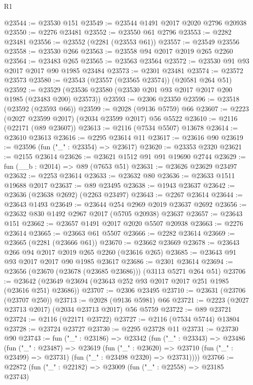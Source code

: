 \begin{lexlean}{R1}
\begin{coremodule}
@23544 := @23530 @151
@23549 := @23544 @1491 @2017 @2020 @2796 @20938
@23550 := @2276 @23481
@23552 := @23550 @61 @2796
@23553 := @2282 @23481
@23556 := @23552 (@2281 (@23553 @61))
@23557 := @23549 @23556
@23558 := @23530 @266
@23563 := @23558 @94 @2017 @2019 @265 @2260
@23564 := @23483 @265
@23565 := @23563 @23564
@23572 := @23530 @91 @93 @2017 @2017 @90 @1985 @23484
@23573 := @2301 @23481
@23574 := @23572 @23573
@23580 := @23543 (@23557 (@23565 @23574)) (@20581 @264 @51)
@23592 := @23529 (@23536 @23580 (@23530 @201 @93 @2017 @2017 @200 @1985 (@23483 @200) @23573))
@23593 := @2306 @23350
@23596 := @23518 (@23592 (@23593 @66))
@23599 := @2028 (@9136 @5759) @66
@23607 := @2223 (@2027 @23599 @2017) (@2034 @23599 @2017) @56 @5522
@23610 := @2116 (@22171 (@89 @23607))
@23613 := @2116 (@7534 @5507) @13678
@23614 := @23610 @23613
@23616 := @2295 @23614 @11
@23617 := @23616 @90
@23619 := @23596 (fun ("_" : @23354) => @23617)
@23620 := @23353 @2320
@23621 := @2155 @23614
@23626 := @23621 @1512 @91 @91 @19690 @2744
@23629 := fun (__b : @2014) => @89 (@7653 @51)
@23631 := @23626 @23629 @23497
@23632 := @2253 @23614
@23633 := @23632 @80
@23636 := @23633 @1511 @19688 @2017
@23637 := @89 @23495
@23638 := @1943 @23637
@23642 := @23636 (@23638 @2692) (@2263 @23497)
@23643 := @2267 @23614
@23644 := @23643 @1493
@23649 := @23644 @254 @2969 @2019 @23637 @2692
@23656 := @23632 @830 @1492 @2967 @2017 (@5705 @20938) @23637
@23657 := @23643 @151
@23662 := @23657 @1491 @2017 @2020 @5507 @20938
@23663 := @2276 @23614
@23665 := @23663 @61 @5507
@23666 := @2282 @23614
@23669 := @23665 (@2281 (@23666 @61))
@23670 := @23662 @23669
@23678 := @23643 @266 @94 @2017 @2019 @265 @2260 (@23616 @265)
@23685 := @23643 @91 @93 @2017 @2017 @90 @1985 @23617
@23686 := @2301 @23614
@23694 := @23656 (@23670 (@23678 (@23685 @23686))) (@3113 @5271 @264 @51)
@23706 := @23642 (@23649 @23694 (@23643 @252 @93 @2017 @2017 @251 @1985 (@23616 @251) @23686))
@23707 := @2306 @23495
@23710 := @23631 (@23706 (@23707 @250))
@23713 := @2028 (@9136 @5981) @66
@23721 := @2223 (@2027 @23713 @2017) (@2034 @23713 @2017) @56 @5759
@23722 := @89 @23721
@23724 := @2116 (@22171 @23722)
@23727 := @2116 (@7534 @5744) @13804
@23728 := @23724 @23727
@23730 := @2295 @23728 @11
@23731 := @23730 @90
@23743 := fun ("_" : @23186) =>
  @23342
    (fun ("_" : @23343) =>
    @23486
      (fun ("_" : @23487) =>
      @23619
        (fun ("_" : @23620) =>
        @23710 (fun ("_" : @23499) => @23731) (fun ("_" : @23498 @2320) => @23731))))
@23766 := @22872
    (fun ("_" : @22182) =>
    @23009
      (fun ("_" : @22558) => @23185 @23743)

\end{coremodule}
\end{lexlean}
